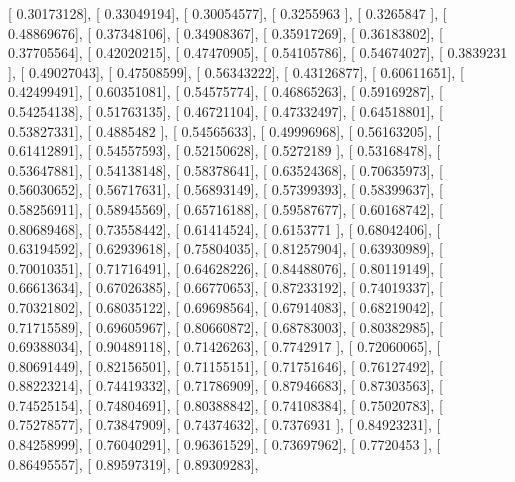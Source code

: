 \documentclass{article}
\begin{document}
       [ 0.30173128],
       [ 0.33049194],
       [ 0.30054577],
       [ 0.3255963 ],
       [ 0.3265847 ],
       [ 0.48869676],
       [ 0.37348106],
       [ 0.34908367],
       [ 0.35917269],
       [ 0.36183802],
       [ 0.37705564],
       [ 0.42020215],
       [ 0.47470905],
       [ 0.54105786],
       [ 0.54674027],
       [ 0.3839231 ],
       [ 0.49027043],
       [ 0.47508599],
       [ 0.56343222],
       [ 0.43126877],
       [ 0.60611651],
       [ 0.42499491],
       [ 0.60351081],
       [ 0.54575774],
       [ 0.46865263],
       [ 0.59169287],
       [ 0.54254138],
       [ 0.51763135],
       [ 0.46721104],
       [ 0.47332497],
       [ 0.64518801],
       [ 0.53827331],
       [ 0.4885482 ],
       [ 0.54565633],
       [ 0.49996968],
       [ 0.56163205],
       [ 0.61412891],
       [ 0.54557593],
       [ 0.52150628],
       [ 0.5272189 ],
       [ 0.53168478],
       [ 0.53647881],
       [ 0.54138148],
       [ 0.58378641],
       [ 0.63524368],
       [ 0.70635973],
       [ 0.56030652],
       [ 0.56717631],
       [ 0.56893149],
       [ 0.57399393],
       [ 0.58399637],
       [ 0.58256911],
       [ 0.58945569],
       [ 0.65716188],
       [ 0.59587677],
       [ 0.60168742],
       [ 0.80689468],
       [ 0.73558442],
       [ 0.61414524],
       [ 0.6153771 ],
       [ 0.68042406],
       [ 0.63194592],
       [ 0.62939618],
       [ 0.75804035],
       [ 0.81257904],
       [ 0.63930989],
       [ 0.70010351],
       [ 0.71716491],
       [ 0.64628226],
       [ 0.84488076],
       [ 0.80119149],
       [ 0.66613634],
       [ 0.67026385],
       [ 0.66770653],
       [ 0.87233192],
       [ 0.74019337],
       [ 0.70321802],
       [ 0.68035122],
       [ 0.69698564],
       [ 0.67914083],
       [ 0.68219042],
       [ 0.71715589],
       [ 0.69605967],
       [ 0.80660872],
       [ 0.68783003],
       [ 0.80382985],
       [ 0.69388034],
       [ 0.90489118],
       [ 0.71426263],
       [ 0.7742917 ],
       [ 0.72060065],
       [ 0.80691449],
       [ 0.82156501],
       [ 0.71155151],
       [ 0.71751646],
       [ 0.76127492],
       [ 0.88223214],
       [ 0.74419332],
       [ 0.71786909],
       [ 0.87946683],
       [ 0.87303563],
       [ 0.74525154],
       [ 0.74804691],
       [ 0.80388842],
       [ 0.74108384],
       [ 0.75020783],
       [ 0.75278577],
       [ 0.73847909],
       [ 0.74374632],
       [ 0.7376931 ],
       [ 0.84923231],
       [ 0.84258999],
       [ 0.76040291],
       [ 0.96361529],
       [ 0.73697962],
       [ 0.7720453 ],
       [ 0.86495557],
       [ 0.89597319],
       [ 0.89309283],
\end{document}
